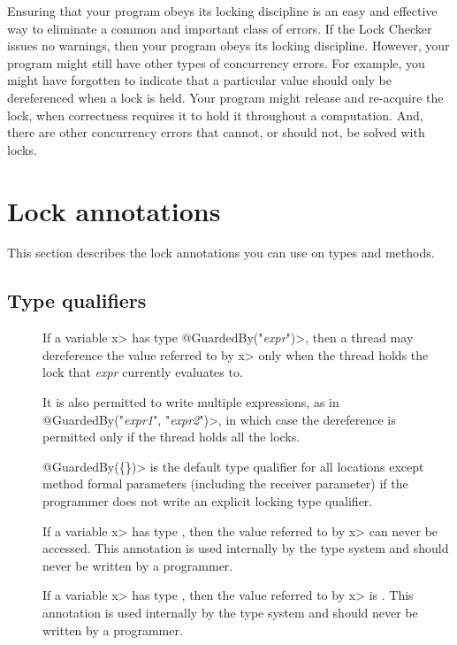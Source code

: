 Ensuring that your program obeys its locking discipline is an easy and
effective way to eliminate a common and important class of errors.
If the Lock Checker issues no warnings, then your program obeys its locking discipline.
However, your program might still have other types of concurrency errors.
For example, you might have forgotten to indicate that a particular value
should only be dereferenced when a lock is held.  Your program might release and
re-acquire the lock, when correctness requires it to hold it throughout a
computation.  And, there are other concurrency errors that cannot, or
should not, be solved with locks.


\section{Lock annotations\label{lock-annotations}}

This section describes the lock annotations you can use on types and methods.


\subsection{Type qualifiers\label{lock-type-qualifiers}}

\begin{description}

\item[]
  If a variable \<x> has type \<@GuardedBy("\emph{expr}")>, then a thread may
  dereference the value referred to by \<x> only when the thread holds the
  lock that \emph{expr} currently evaluates to.

  It is also permitted to write multiple expressions, as in
  \<@GuardedBy(\ttlcb"\emph{expr1}", "\emph{expr2}"\ttrcb)>, in which case
  the dereference is
  permitted only if the thread holds all the locks.

  \<@GuardedBy(\{\})> is the default type qualifier for all locations
  except method formal parameters (including the receiver parameter)
  if the programmer does not
  write an explicit locking type qualifier.

\item[]
  If a variable \<x> has type , then
  the value referred to by \<x> can never be accessed.
  This annotation is used internally by the type system
  and should never be written by a programmer.

\item[]
  If a variable \<x> has type , then
  the value referred to by \<x> is .
  This annotation is used internally by the type system
  and should never be written by a programmer.

\end{description}


